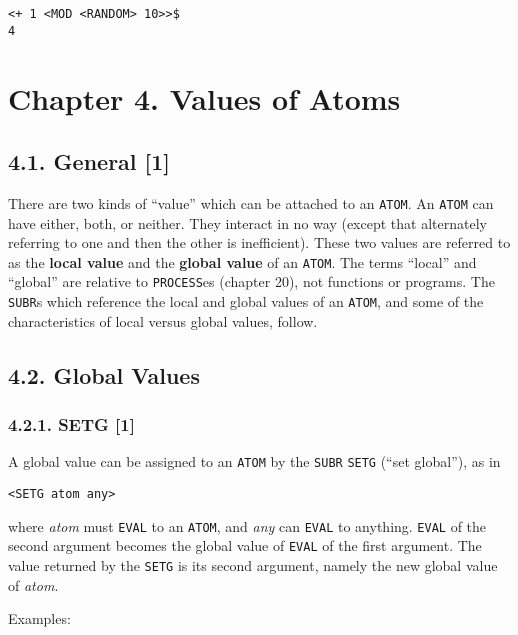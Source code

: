 \documentclass[a4paper,]{article}
\begin{document}
\begin{verbatim}
<+ 1 <MOD <RANDOM> 10>>$
4
\end{verbatim}

\section{Chapter 4. Values of Atoms}\label{chapter-4.-values-of-atoms}

\subsection{4.1. General {[}1{]}}\label{general-1-1}

There are two kinds of ``value'' which can be attached to an \texttt{ATOM}. An \texttt{ATOM} can have either, both, or
neither. They interact in no way (except that alternately referring to one and then the other is inefficient). These two
values are referred to as the \textbf{local value} and the \textbf{global value} of an \texttt{ATOM}. The terms ``local''
and ``global'' are relative to \texttt{PROCESS}es (chapter 20), not functions or programs. The \texttt{SUBR}s which
reference the local and global values of an \texttt{ATOM}, and some of the characteristics of local versus global values,
follow.

\subsection{4.2. Global Values}\label{global-values}

\subsubsection{4.2.1. SETG {[}1{]}}\label{setg-1}

A global value can be assigned to an \texttt{ATOM} by the \texttt{SUBR} \texttt{SETG} (``set
global''), as in

\begin{verbatim}
<SETG atom any>
\end{verbatim}

where \emph{atom} must \texttt{EVAL} to an \texttt{ATOM}, and \emph{any} can \texttt{EVAL} to anything. \texttt{EVAL} of
the second argument becomes the global value of \texttt{EVAL} of the first argument. The value returned by the
\texttt{SETG} is its second argument, namely the new global value of \emph{atom}.

Examples:
\end{document}
